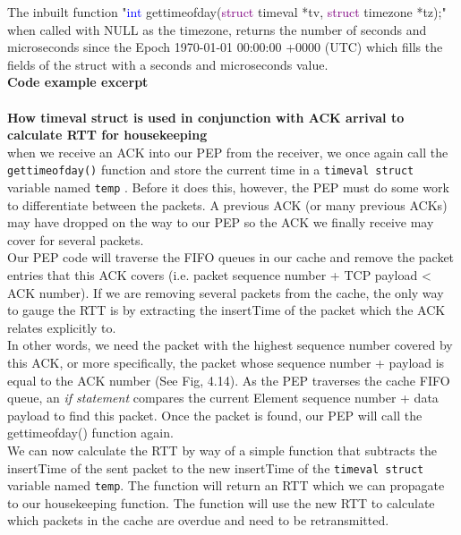 \documentclass{uathesis}
\begin{document}
The inbuilt function "\textcolor{blue}{int} gettimeofday(\textcolor{purple}{struct} timeval *tv, \textcolor{purple}{struct} timezone *tz);" when called with NULL as the timezone, returns the number of seconds and microseconds since the Epoch  1970-01-01 00:00:00 +0000 (UTC) which fills the fields of the struct with a seconds and microseconds value. \\

\noindent \textbf{Code example excerpt}\\
 \\

\noindent \textbf{How timeval struct is used in conjunction with ACK arrival to calculate RTT for housekeeping}\\
when we receive an ACK into our PEP from the receiver, we once again call the {\tt gettimeofday()} function and store the current time in a {\tt timeval struct} variable named {\tt temp} . Before it does this, however, the PEP must do some work to differentiate between the packets. A previous ACK (or many previous ACKs) may have dropped on the way to our PEP so the ACK we finally receive may cover for several packets. \\

Our PEP code will traverse the FIFO queues in our cache and remove the packet entries that this ACK covers (i.e. packet sequence number + TCP payload < ACK number). If we are removing several packets from the cache, the only way to gauge the RTT is by extracting the insertTime of the packet which the ACK relates explicitly to. \\

In other words, we need the packet with the highest sequence number covered by this ACK, or more specifically, the packet whose sequence number + payload is equal to the ACK number (See Fig, 4.14). As the PEP traverses the cache FIFO queue, an \emph{if statement} compares the current Element sequence number + data payload to find this packet. Once the packet is found, our PEP will call the gettimeofday() function again. \\

We can now calculate the RTT by way of a simple function that subtracts the insertTime of the sent packet to the new insertTime of the {\tt timeval struct} variable named {\tt temp}. The function will return an RTT which we can propagate to our housekeeping function. The function will use the new RTT to calculate which packets in the cache are overdue and need to be retransmitted.  \\
\end{document}
